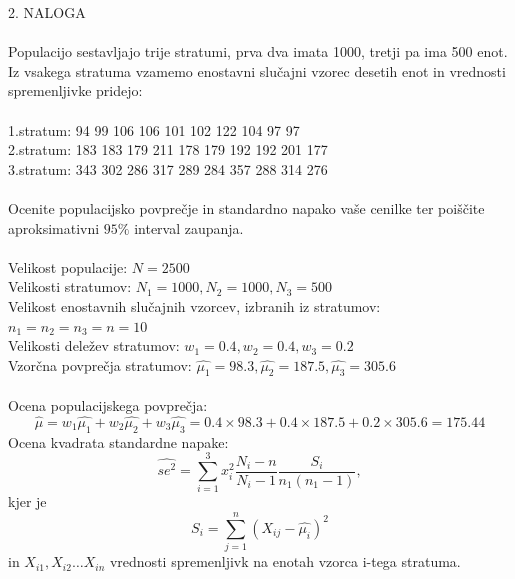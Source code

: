 \documentclass[a4paper]{article}
\begin{document}
\large{2. NALOGA}
\\ \\
Populacijo sestavljajo trije stratumi, prva dva imata 1000, tretji pa ima 500 enot. Iz vsakega stratuma vzamemo enostavni slučajni vzorec desetih enot in vrednosti spremenljivke pridejo:\\ \\
1.stratum: 94 99 106 106 101 102 122 104 97 97 \\
2.stratum: 183 183 179 211 178 179 192 192 201 177 \\
3.stratum: 343 302 286 317 289 284 357 288 314 276\\ \\
Ocenite populacijsko povprečje in standardno napako vaše cenilke ter poiščite aproksimativni $95\%$ interval zaupanja. \\ \\
Velikost populacije: $N = 2500$ \\
Velikosti stratumov: $N_1 = 1000, N_2 = 1000, N_3 = 500$  \\
Velikost enostavnih slučajnih vzorcev, izbranih iz stratumov: $n_1 = n_2 = n_3 = n = 10$ \\
Velikosti deležev stratumov: $w_1 = 0.4, w_2 = 0.4, w_3 = 0.2 $ \\
Vzorčna povprečja stratumov: $\hat{\mu_1} = 98.3,  \hat{\mu_2} = 187.5,  \hat{\mu_3} = 305.6$ \\ 
\\
Ocena populacijskega povprečja:
\begin{equation*}
\hat{\mu} = w_1\hat{\mu_1} + w_2 \hat{\mu_2} + w_3 \hat{\mu_3} =  0.4 \times 98.3 + 0.4 \times 187.5 + 0.2 \times 305.6 = 175.44
\end{equation*}
Ocena kvadrata standardne napake:
 \begin{equation*}
\widehat{ se^2 }= \sum_{i=1}^{3} x_i^2 \frac{N_i-n}{N_i-1}\frac{S_i}{n_1(n_1-1)},
\end{equation*}
kjer je 
 \begin{equation*}
S_i = \sum_{j=1}^{n} (X_{ij} - \hat{\mu_i})^2 
\end{equation*}
in $X_{i1}, X_{i2} \ldots X_{in}$ vrednosti spremenljivk na enotah vzorca i-tega stratuma.
\end{document}
